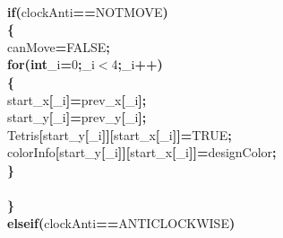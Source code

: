 \documentclass[a4paper, 10pt]{article}
\newcommand\SPC{\hspace*{0.6em}}
\newcommand{\CppAIdentifier}[1]{#1}
\newcommand{\CppANumber}[1]{\textcolor[rgb]{0.5,0,0.5}{#1}}
\newcommand{\CppAReservedWord}[1]{\textbf{#1}}
\newcommand{\CppASpace}[1]{\colorbox[rgb]{1,1,1}{#1}}
\newcommand{\CppASymbol}[1]{\textbf{\textcolor[rgb]{1,0,0}{#1}}}
\begin{document}
\begin{ttfamily}
\\
\CppASpace{\SPC \SPC \SPC \SPC }\CppAReservedWord{if}\CppASymbol{(}\CppAIdentifier{clockAnti}\CppASymbol{==}\CppAIdentifier{NOTMOVE}\CppASymbol{)}\\
\CppASpace{\SPC \SPC \SPC \SPC }\CppASymbol{\{}\\
\CppASpace{\SPC \SPC \SPC \SPC \SPC }\CppAIdentifier{canMove}\CppASymbol{=}\CppAIdentifier{FALSE}\CppASymbol{;}\\
\CppASpace{\SPC \SPC \SPC \SPC \SPC }\CppAReservedWord{for}\CppASymbol{(}\CppAReservedWord{int}\CppASpace{\SPC }\CppAIdentifier{\_i}\CppASymbol{=}\CppANumber{0}\CppASymbol{;}\CppAIdentifier{\_i}\CppASymbol{$<$}\CppANumber{4}\CppASymbol{;}\CppAIdentifier{\_i}\CppASymbol{++}\CppASymbol{)}\\
\CppASpace{\SPC \SPC \SPC \SPC \SPC }\CppASymbol{\{}\\
\CppASpace{\SPC \SPC \SPC \SPC \SPC \SPC }\CppAIdentifier{start\_x}\CppASymbol{[}\CppAIdentifier{\_i}\CppASymbol{]}\CppASymbol{=}\CppAIdentifier{prev\_x}\CppASymbol{[}\CppAIdentifier{\_i}\CppASymbol{]}\CppASymbol{;}\\
\CppASpace{\SPC \SPC \SPC \SPC \SPC \SPC }\CppAIdentifier{start\_y}\CppASymbol{[}\CppAIdentifier{\_i}\CppASymbol{]}\CppASymbol{=}\CppAIdentifier{prev\_y}\CppASymbol{[}\CppAIdentifier{\_i}\CppASymbol{]}\CppASymbol{;}\\
\CppASpace{\SPC \SPC \SPC \SPC \SPC \SPC }\CppAIdentifier{Tetris}\CppASymbol{[}\CppAIdentifier{start\_y}\CppASymbol{[}\CppAIdentifier{\_i}\CppASymbol{]}\CppASymbol{]}\CppASymbol{[}\CppAIdentifier{start\_x}\CppASymbol{[}\CppAIdentifier{\_i}\CppASymbol{]}\CppASymbol{]}\CppASymbol{=}\CppAIdentifier{TRUE}\CppASymbol{;}\\
\CppASpace{\SPC \SPC \SPC \SPC \SPC \SPC }\CppAIdentifier{colorInfo}\CppASymbol{[}\CppAIdentifier{start\_y}\CppASymbol{[}\CppAIdentifier{\_i}\CppASymbol{]}\CppASymbol{]}\CppASymbol{[}\CppAIdentifier{start\_x}\CppASymbol{[}\CppAIdentifier{\_i}\CppASymbol{]}\CppASymbol{]}\CppASymbol{=}\CppAIdentifier{designColor}\CppASymbol{;}\\
\CppASpace{\SPC \SPC \SPC \SPC \SPC }\CppASymbol{\}}\\
\\
\CppASpace{\SPC \SPC \SPC \SPC }\CppASymbol{\}}\\
\CppASpace{\SPC \SPC \SPC \SPC }\CppAReservedWord{else}\CppASpace{\SPC }\CppAReservedWord{if}\CppASymbol{(}\CppAIdentifier{clockAnti}\CppASymbol{==}\CppAIdentifier{ANTICLOCKWISE}\CppASymbol{)}\\

\end{ttfamily}
\end{document}
